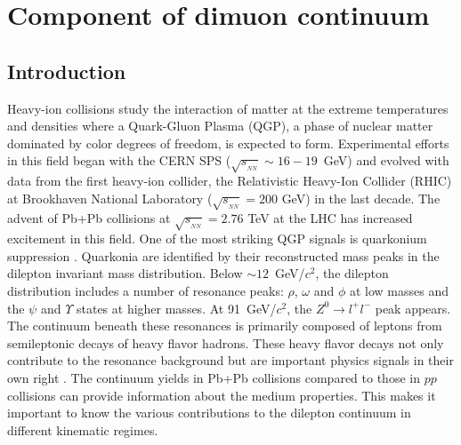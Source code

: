 \chapter{Component of dimuon continuum}
\label{chap:DiMuContinuum}


\section{Introduction}

Heavy-ion collisions study the interaction of matter at the extreme 
temperatures and densities where a Quark-Gluon Plasma (QGP), a phase of nuclear
matter dominated by color degrees of freedom, is expected to form.  Experimental
efforts in this field began with the CERN SPS ($\sqrt{s_{_{NN}}} \sim 16-19$~GeV)
and evolved with data \cite{INTRO} from the first heavy-ion collider, the 
Relativistic Heavy-Ion Collider (RHIC) at Brookhaven National Laboratory 
($\sqrt{s_{_{NN}}} = 200$ GeV) in the last decade.  The advent of Pb+Pb 
collisions at $\sqrt{s_{_{NN}}} = 2.76$ TeV at the LHC has increased excitement 
in this field.  One of the most striking QGP signals is quarkonium suppression 
\cite{SATZ}. Quarkonia are identified by their reconstructed mass peaks in the 
dilepton invariant mass distribution.  Below $\sim 12$~GeV/$c^2$, the dilepton
distribution includes a number of resonance peaks: $\rho$, $\omega $ and $\phi$
at low masses and the $\psi$ and $\Upsilon$ states at higher masses.  At
91~GeV/$c^2$, the $Z^0 \rightarrow l^+ l^-$ peak appears.  The continuum beneath
these resonances is primarily composed of leptons from semileptonic decays of
heavy flavor hadrons.  These heavy flavor decays not only contribute to the
resonance background but are important physics signals in their own right
\cite{LastCallLHC,GAVIN,LIN,LIN2,SHUR,DKS}. The continuum yields in 
Pb+Pb collisions compared to those in $pp$ collisions can provide information 
about the medium properties.  This makes it important to know the various 
contributions to the dilepton continuum in different kinematic regimes. 
 
